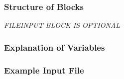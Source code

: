 \vspace{5mm}
\subsubsection{Structure of Blocks}


\vspace{5mm}
\noindent \textit{FILEINPUT BLOCK IS OPTIONAL}


\vspace{5mm}
\subsubsection{Explanation of Variables}
\begin{description}

\end{description}

\vspace{5mm}
\subsubsection{Example Input File}


